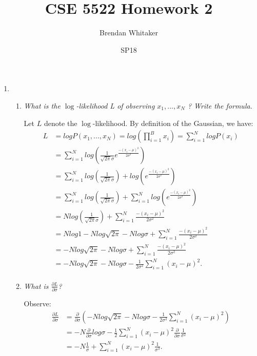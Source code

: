 \documentclass[12pt,oneside,reqno]{amsart}
\theoremstyle{plain}
\theoremstyle{definition}
\theoremstyle{remark}
\newcommand{\bb}{\vspace{3mm}}
\newcommand{\bee}{\begin{equation}\begin{aligned}}
\newcommand{\eee}{\end{aligned}\end{equation}}
\newcommand{\fracc}{\frac}
\newcommand{\lpar}{\left(}
\newcommand{\rpar}{\right)}
\begin{document}
\title{CSE 5522 Homework 2}
\date{SP18}
\author[Brendan Whitaker]{Brendan Whitaker}
\maketitle



\begin{enumerate}[label=\arabic*.]

\item \begin{enumerate}

\item \textit{What is the $\log$-likelihood L of observing  $x_1,...,x_N$
? Write the formula.}
\bb


Let $L$ denote the $\log$-likelihood. By definition of the Gaussian, we have: 
\bee
L &= logP(x_1,...,x_N) = log\lpar \prod_{i = 1}^B x_i\rpar  = \sum_{i = 1}^N log P(x_i)\\
&= \sum_{i = 1}^N log \lpar \fracc{1}{\sqrt{2\pi}\sigma}e^{\fracc{-(x_i - \mu)^2}{2\sigma^2}} \rpar\\
 &= \sum_{i = 1}^N log \lpar \fracc{1}{\sqrt{2\pi}\sigma}\rpar  + log\lpar e^{\fracc{-(x_i - \mu)^2}{2\sigma^2}} \rpar \\
&= \sum_{i = 1}^N log \lpar \fracc{1}{\sqrt{2\pi}\sigma}\rpar  + \sum_{i = 1}^N log\lpar e^{\fracc{-(x_i - \mu)^2}{2\sigma^2}} \rpar \\
&= N log \lpar \fracc{1}{\sqrt{2\pi}\sigma}\rpar  + \sum_{i = 1}^N \fracc{-(x_i - \mu)^2}{2\sigma^2} \\
&=Nlog1 - Nlog\sqrt{2\pi} - Nlog\sigma  + \sum_{i = 1}^N \fracc{-(x_i - \mu)^2}{2\sigma^2} \\
&=- Nlog\sqrt{2\pi} - Nlog\sigma  + \sum_{i = 1}^N \fracc{-(x_i - \mu)^2}{2\sigma^2} \\
&= - Nlog\sqrt{2\pi} - Nlog\sigma  - \fracc{1}{2\sigma^2}\sum_{i = 1}^N (x_i - \mu)^2. \\
\eee

\item \textit{What is $\fracc{\partial L}{\partial \sigma}$?}

\bb
Observe:
\bee
\fracc{\partial L}{\partial \sigma} &= \fracc{\partial}{\partial \sigma}\lpar - Nlog\sqrt{2\pi} - Nlog\sigma  - \fracc{1}{2\sigma^2}\sum_{i = 1}^N (x_i - \mu)^2\rpar\\
&=  -N \fracc{\partial}{\partial \sigma}log\sigma  -\fracc{1}{2}\sum_{i = 1}^N (x_i - \mu)^2 \fracc{\partial}{\partial \sigma}\fracc{1}{\sigma^2}\\
&=  -N \fracc{1}{\sigma}  + \sum_{i = 1}^N (x_i - \mu)^2 \fracc{1}{\sigma^{3}}.\\
\eee


\end{enumerate}
\end{enumerate}
\end{document}
